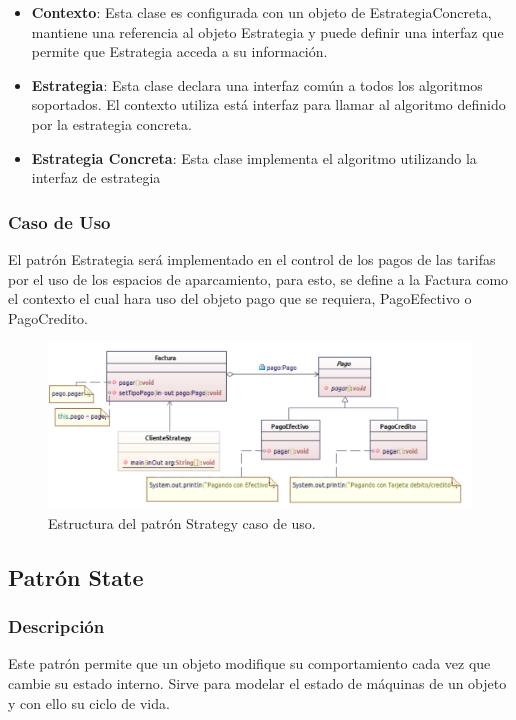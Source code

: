 \begin{itemize}
	\item \textbf{Contexto}: Esta clase es configurada con un objeto de EstrategiaConcreta, mantiene una referencia al objeto Estrategia y puede definir una interfaz que permite que Estrategia acceda a su información.
	\item \textbf{Estrategia}: Esta clase declara una interfaz común a todos los algoritmos soportados. El contexto utiliza está interfaz para llamar al algoritmo definido por la estrategia concreta.
	\item \textbf{Estrategia Concreta}: Esta clase implementa el algoritmo utilizando la interfaz de estrategia
\end{itemize}


\subsubsection{Caso de Uso}
El patrón Estrategia será implementado en el control de los pagos de las tarifas por el uso de los espacios de aparcamiento, para esto, se define a la Factura como el contexto el cual hara uso del objeto pago que se requiera, PagoEfectivo o PagoCredito.

\begin{figure}[th!]
	\centering
	\includegraphics[width=.7\linewidth]{imagenes/Patrones/Strategy_caso.pdf}
	\caption{Estructura del patrón Strategy caso de uso.\cite{gof}}	
\end{figure}

\subsection{Patrón State}

\subsubsection{Descripción}
Este patrón permite que un objeto modifique su comportamiento cada vez que cambie su estado interno. Sirve para modelar el estado de máquinas de un objeto y con ello su ciclo de vida.

